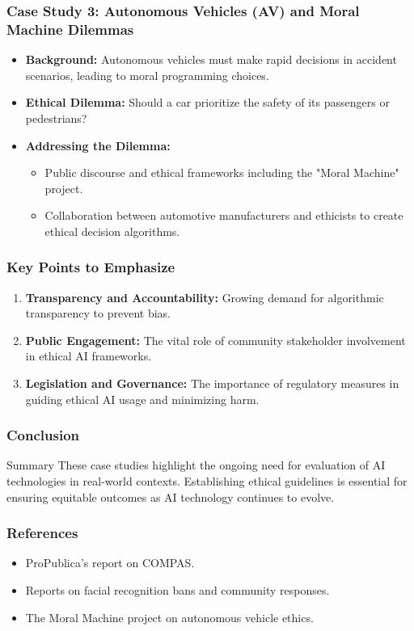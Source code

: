\documentclass[aspectratio=169]{beamer}
\begin{document}
\begin{frame}[fragile]
  \frametitle{Case Study 3: Autonomous Vehicles (AV) and Moral Machine Dilemmas}
  \begin{itemize}
    \item \textbf{Background:} Autonomous vehicles must make rapid decisions in accident scenarios, leading to moral programming choices.
    \item \textbf{Ethical Dilemma:} Should a car prioritize the safety of its passengers or pedestrians?
    \item \textbf{Addressing the Dilemma:}
      \begin{itemize}
        \item Public discourse and ethical frameworks including the "Moral Machine" project.
        \item Collaboration between automotive manufacturers and ethicists to create ethical decision algorithms.
      \end{itemize}
  \end{itemize}
\end{frame}

\begin{frame}[fragile]
  \frametitle{Key Points to Emphasize}
  \begin{enumerate}
    \item \textbf{Transparency and Accountability:} Growing demand for algorithmic transparency to prevent bias.
    \item \textbf{Public Engagement:} The vital role of community stakeholder involvement in ethical AI frameworks.
    \item \textbf{Legislation and Governance:} The importance of regulatory measures in guiding ethical AI usage and minimizing harm.
  \end{enumerate}
\end{frame}

\begin{frame}[fragile]
  \frametitle{Conclusion}
  \begin{block}{Summary}
    These case studies highlight the ongoing need for evaluation of AI technologies in real-world contexts. Establishing ethical guidelines is essential for ensuring equitable outcomes as AI technology continues to evolve.
  \end{block}
\end{frame}

\begin{frame}[fragile]
  \frametitle{References}
  \begin{itemize}
    \item ProPublica's report on COMPAS.
    \item Reports on facial recognition bans and community responses.
    \item The Moral Machine project on autonomous vehicle ethics.
  \end{itemize}
\end{frame}
\end{document}
